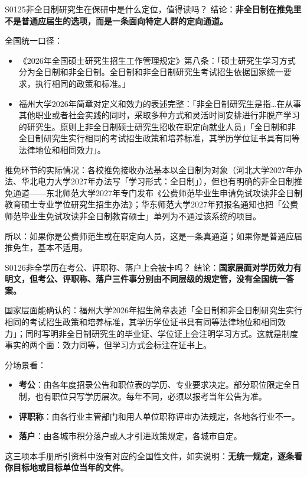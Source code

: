 \begin{qa}{S0125}{非全日制研究生在保研中是什么定位，值得读吗？}
结论：\textbf{非全日制在推免里不是普通应届生的选项，而是一条面向特定人群的定向通道。}

全国统一口径：
\begin{itemize}
  \item 《2026年全国硕士研究生招生工作管理规定》第八条：「硕士研究生学习方式分为全日制和非全日制。全日制和非全日制研究生考试招生依据国家统一要求，执行相同的政策和标准。」
  \item 福州大学2026年简章对定义和效力的表述完整：「非全日制研究生是指…在从事其他职业或者社会实践的同时，采取多种方式和灵活时间安排进行非脱产学习的研究生。原则上非全日制硕士研究生招收在职定向就业人员」「全日制和非全日制研究生实行相同的考试招生政策和培养标准，其学历学位证书具有同等法律地位和相同效力」。
\end{itemize}

推免环节的实际情况：各校推免接收办法基本以全日制为对象（河北大学2027年办法、华北电力大学2027年办法写「学习形式：全日制」），但也有明确的非全日制推免通道——东北师范大学2027年专门发布《公费师范毕业生申请免试攻读非全日制教育硕士专业学位研究生招生办法》；华东师范大学2027年预报名通知也把「公费师范毕业生免试攻读非全日制教育硕士」单列为不通过该系统的项目。

所以：如果你是公费师范生或在职定向人员，这是一条真通道；如果你是普通应届推免生，基本不适用。
\end{qa}

\begin{qa}{S0126}{非全学历在考公、评职称、落户上会被卡吗？}
结论：\textbf{国家层面对学历效力有明文，但考公、评职称、落户三件事分别由不同层级的规定管，没有全国统一答案。}

国家层面能确认的：福州大学2026年招生简章表述「全日制和非全日制研究生实行相同的考试招生政策和培养标准，其学历学位证书具有同等法律地位和相同效力」；同时写明非全日制研究生的毕业证、学位证上会注明学习方式。这就是制度事实的两个面：效力同等，但学习方式会标注在证书上。

分场景看：
\begin{itemize}
  \item \textbf{考公}：由各年度招录公告和职位表的学历、专业要求决定。部分职位限定全日制，也有职位只写学历层次。每年不同，必须以报考当年公告为准。
  \item \textbf{评职称}：由各行业主管部门和用人单位职称评审办法规定，各地各行业不一。
  \item \textbf{落户}：由各城市积分落户或人才引进政策规定，各城市自定。
\end{itemize}

这三项本手册所引资料中没有对应的全国性文件，如实说明：\textbf{无统一规定，逐条看你目标地或目标单位当年的文件}。
\end{qa}

